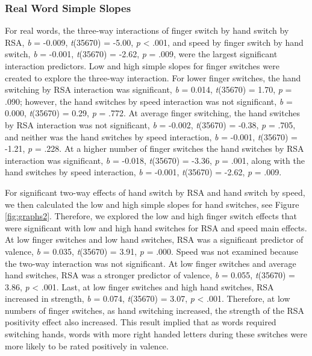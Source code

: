 \documentclass[
  english,
  man]{apa7}
\begin{document}
\hypertarget{real-word-simple-slopes}{%
\subsubsection{Real Word Simple Slopes}\label{real-word-simple-slopes}}

For real words, the three-way interactions of finger switch by hand switch by RSA, \emph{b} = -0.009, \emph{t}(35670) = -5.00, \emph{p} \textless{} .001, and speed by finger switch by hand switch, \emph{b} = -0.001, \emph{t}(35670) = -2.62, \emph{p} = .009, were the largest significant interaction predictors. Low and high simple slopes for finger switches were created to explore the three-way interaction. For lower finger switches, the hand switching by RSA interaction was significant, \emph{b} = 0.014, \emph{t}(35670) = 1.70, \emph{p} = .090; however, the hand switches by speed interaction was not significant, \emph{b} = 0.000, \emph{t}(35670) = 0.29, \emph{p} = .772. At average finger switching, the hand switches by RSA interaction was not significant, \emph{b} = -0.002, \emph{t}(35670) = -0.38, \emph{p} = .705, and neither was the hand switches by speed interaction, \emph{b} = -0.001, \emph{t}(35670) = -1.21, \emph{p} = .228. At a higher number of finger switches the hand switches by RSA interaction was significant, \emph{b} = -0.018, \emph{t}(35670) = -3.36, \emph{p} = .001, along with the hand switches by speed interaction, \emph{b} = -0.001, \emph{t}(35670) = -2.62, \emph{p} = .009.

For significant two-way effects of hand switch by RSA and hand switch by speed, we then calculated the low and high simple slopes for hand switches, see Figure \ref{fig:graphs2}. Therefore, we explored the low and high finger switch effects that were significant with low and high hand switches for RSA and speed main effects. At low finger switches and low hand switches, RSA was a significant predictor of valence, \emph{b} = 0.035, \emph{t}(35670) = 3.91, \emph{p} = .000. Speed was not examined because the two-way interaction was not significant. At low finger switches and average hand switches, RSA was a stronger predictor of valence, \emph{b} = 0.055, \emph{t}(35670) = 3.86, \emph{p} \textless{} .001. Last, at low finger switches and high hand switches, RSA increased in strength, \emph{b} = 0.074, \emph{t}(35670) = 3.07, \emph{p} \textless{} .001. Therefore, at low numbers of finger switches, as hand switching increased, the strength of the RSA positivity effect also increased. This result implied that as words required switching hands, words with more right handed letters during these switches were more likely to be rated positively in valence.
\end{document}

